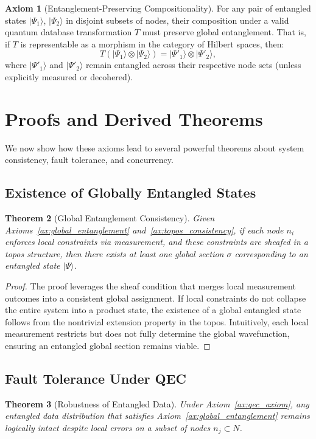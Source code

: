\documentclass[12pt]{article}
\newtheorem{theorem}{Theorem}[section]
\theoremstyle{definition}
\newtheorem{axiom}[theorem]{Axiom}
\theoremstyle{remark}
\begin{document}
\begin{axiom}[Entanglement-Preserving Compositionality]
\label{ax:entang_preserve}
For any pair of entangled states $|\Psi_1\rangle$, $|\Psi_2\rangle$ in disjoint subsets of nodes, their composition under a valid quantum database transformation $T$ must preserve global entanglement. That is, if $T$ is representable as a morphism in the category of Hilbert spaces, then:
\[
T(|\Psi_1\rangle \otimes |\Psi_2\rangle) = |\Psi'_1\rangle \otimes |\Psi'_2\rangle,
\]
where $|\Psi'_1\rangle$ and $|\Psi'_2\rangle$ remain entangled across their respective node sets (unless explicitly measured or decohered).
\end{axiom}

\section{Proofs and Derived Theorems}
\label{sec:proofs}
We now show how these axioms lead to several powerful theorems about system consistency, fault tolerance, and concurrency.

\subsection{Existence of Globally Entangled States}
\begin{theorem}[Global Entanglement Consistency]
\label{th:global_consistency}
Given Axioms~\ref{ax:global_entanglement} and~\ref{ax:topos_consistency}, if each node $n_i$ enforces local constraints via measurement, and these constraints are sheafed in a topos structure, then there exists at least one global section $\sigma$ corresponding to an entangled state $|\Psi\rangle$. 
\end{theorem}

\begin{proof}
The proof leverages the sheaf condition that merges local measurement outcomes into a consistent global assignment. If local constraints do not collapse the entire system into a product state, the existence of a global entangled state follows from the nontrivial extension property in the topos. Intuitively, each local measurement restricts but does not fully determine the global wavefunction, ensuring an entangled global section remains viable.
\end{proof}

\subsection{Fault Tolerance Under QEC}
\begin{theorem}[Robustness of Entangled Data]
\label{th:robustness_entangled}
Under Axiom~\ref{ax:qec_axiom}, any entangled data distribution that satisfies Axiom~\ref{ax:global_entanglement} remains logically intact despite local errors on a subset of nodes $n_j \subset N$.
\end{theorem}
\end{document}
